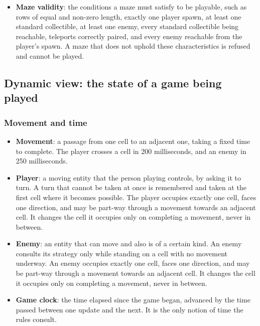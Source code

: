 \begin{itemize}
  its seconds remaining are shown as a potential score; they become the final result only on victory, while every
  defeat yields zero points. In Survival, a point is awarded for each difficulty wave survived.
  \item \textbf{Maze validity}: the conditions a maze must satisfy to be playable, such as rows of equal and non-zero
  length, exactly one player spawn, at least one standard collectible, at least one enemy, every standard collectible being reachable,
  teleports correctly paired, and every enemy reachable from the player's spawn. A maze that does not uphold
  these characteristics is refused and cannot be played.
\end{itemize}

\subsection{Dynamic view: the state of a game being played}

\subsubsection{Movement and time}

\begin{itemize}
  \item \textbf{Movement}: a passage from one cell to an adjacent one, taking a fixed time to complete. The player
  crosses a cell in 200 milliseconds, and an enemy in 250 milliseconds.
  \item \textbf{Player}: a moving entity that the person playing controls, by asking it to turn. A turn that cannot
  be taken at once is remembered and taken at the first cell where it becomes possible. The player occupies
  exactly one cell, faces one direction, and may be part-way through a movement towards an adjacent cell.
  It changes the cell it occupies only on completing a movement, never in between.
  \item \textbf{Enemy}: an entity that can move and also is of a certain kind. An enemy consults its strategy only
  while standing on a cell with no movement underway. An enemy occupies exactly one cell, faces one direction,
  and may be part-way through a movement towards an adjacent cell. It changes the cell it occupies only on
  completing a movement, never in between.
  \item \textbf{Game clock}: the time elapsed since the game began, advanced by the time passed between one update
  and the next. It is the only notion of time the rules consult.
\end{itemize}

